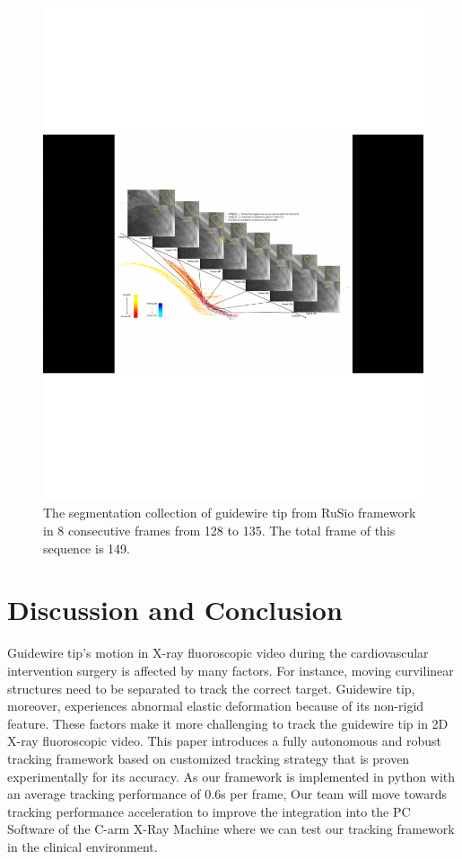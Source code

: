 \documentclass[journal]{IEEEtran}
\begin{document}
\begin{figure}[!htb]
	\centering  
	\includegraphics[width=7.1in]{figures/figure7}
		\caption{The segmentation collection of guidewire tip from RuSio framework in 8 consecutive frames from 128 to 135. The total frame of this sequence is 149.}  
	\label{fig:mcmthesis-logo} 
\end{figure}





\section{Discussion and Conclusion}
Guidewire tip's motion in X-ray fluoroscopic video during the cardiovascular intervention surgery is affected by many factors. For instance, moving curvilinear structures need to be separated to track the correct target. Guidewire tip, moreover, experiences abnormal elastic deformation because of its non-rigid feature. These factors make it more challenging to track the guidewire tip in 2D X-ray fluoroscopic video. This paper introduces a fully autonomous and robust tracking framework based on customized tracking strategy that is proven experimentally for its accuracy. As our framework is implemented in python with an average tracking performance of 0.6s per frame, Our team will move towards tracking performance acceleration to improve the integration into the PC Software of the C-arm X-Ray Machine where we can test our tracking framework in the clinical environment. 
\end{document}
